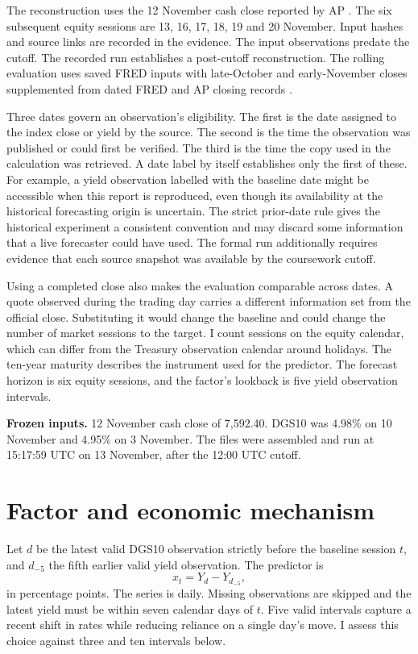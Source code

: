 \documentclass[11pt,a4paper]{article}
\newcommand{\freezeinputs}{12 November cash close of 7,592.40. DGS10 was 4.98\% on 10 November and 4.95\% on 3 November. The files were assembled and run at 15:17:59 UTC on 13 November, after the 12:00 UTC cutoff}
\begin{document}
The reconstruction uses the 12 November cash close reported by AP \cite{apnov12}. The six subsequent equity sessions are 13, 16, 17, 18, 19 and 20 November. Input hashes and source links are recorded in the evidence. The input observations predate the cutoff. The recorded run establishes a post-cutoff reconstruction. The rolling evaluation uses saved FRED inputs with late-October and early-November closes supplemented from dated FRED and AP closing records \cite{sp500,apnov2,apnov4,apnov5}.

Three dates govern an observation's eligibility. The first is the date assigned to the index close or yield by the source. The second is the time the observation was published or could first be verified. The third is the time the copy used in the calculation was retrieved. A date label by itself establishes only the first of these. For example, a yield observation labelled with the baseline date might be accessible when this report is reproduced, even though its availability at the historical forecasting origin is uncertain. The strict prior-date rule gives the historical experiment a consistent convention and may discard some information that a live forecaster could have used. The formal run additionally requires evidence that each source snapshot was available by the coursework cutoff.

Using a completed close also makes the evaluation comparable across dates. A quote observed during the trading day carries a different information set from the official close. Substituting it would change the baseline and could change the number of market sessions to the target. I count sessions on the equity calendar, which can differ from the Treasury observation calendar around holidays. The ten-year maturity describes the instrument used for the predictor. The forecast horizon is six equity sessions, and the factor's lookback is five yield observation intervals.

\textbf{Frozen inputs.} \freezeinputs.

\section{Factor and economic mechanism}
Let $d$ be the latest valid DGS10 observation strictly before the baseline session $t$, and $d_{-5}$ the fifth earlier valid yield observation. The predictor is
\[
x_t=Y_d-Y_{d_{-5}},
\]
in percentage points. The series is daily. Missing observations are skipped and the latest yield must be within seven calendar days of $t$. Five valid intervals capture a recent shift in rates while reducing reliance on a single day's move. I assess this choice against three and ten intervals below.
\end{document}
